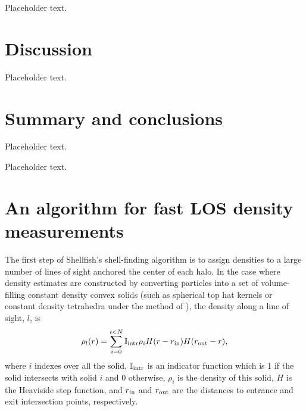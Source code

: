 \documentclass[numberedappendix,apj]{emulateapj}
\begin{document}
Placeholder text.

\section{Discussion}
\label{sec:discussion}

Placeholder text.
 
\section{Summary and conclusions}
\label{sec:summary}

Placeholder text.

\acknowledgments

Placeholder text.




\appendix

\section{An algorithm for fast LOS density measurements}
\label{sec:intersection}

The first step of Shellfish's shell-finding algorithm is to assign densities to
a large number of lines of sight anchored the center of each halo. In the case
where density estimates are constructed by converting particles into a set of
volume-filling constant density convex solids (such as spherical top hat kernels
or constant density tetrahedra under the method of \citealt{abel_et_al_12}), the density along a line of sight, $l$, is
\begin{equation}
        \label{eq:los-rho}
        \rho_l(r) = \sum_{i=0}^{i<N}\mathbb{I}_{\rm intr}\rho_i
        H(r - r_{\rm in})H(r_{\rm out} - r),
\end{equation}
where $i$ indexes over all the solid, $\mathbb{I}_{\rm intr}$ is an indicator
function which is 1 if the solid intersects with solid $i$ and 0 otherwise,
$\rho_i$ is the density of this solid, $H$ is the Heaviside step function, and
$r_{\rm in}$ and $r_{\rm out}$ are the distances to entrance and exit
intersection points, respectively.
\end{document}
